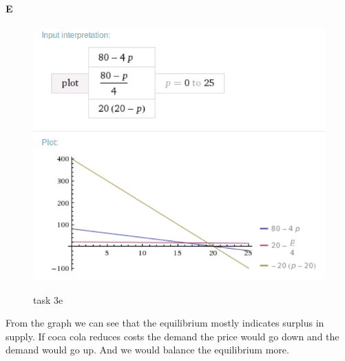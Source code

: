 \documentclass[12pt, a4paper]{article}
\begin{document}
\paragraph{E}
\begin{figure}[htb]
    \centering
    \includegraphics[width=\textwidth]{plot4}
    \label{plot4}
    \caption{}
task 3e
\end{figure}
From the graph we can see that the equilibrium mostly indicates surplus in
supply. If coca cola reduces costs the demand the price would go down and the
demand would go up. And we would balance the equilibrium more. 
\end{document}
